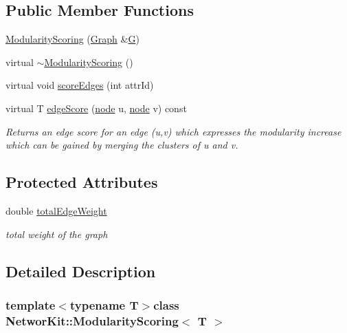 \subsection*{Public Member Functions}
\begin{DoxyCompactItemize}
\item 
\hyperlink{class_networ_kit_1_1_modularity_scoring_a0150d4dbef0af9e530410f4b2d98f144}{Modularity\-Scoring} (\hyperlink{class_networ_kit_1_1_graph}{Graph} \&\hyperlink{class_networ_kit_1_1_edge_scoring_a236d40c30ccbb022125d3dc915865d8a}{G})
\item 
virtual \hyperlink{class_networ_kit_1_1_modularity_scoring_a153adadf776bcb6ad8f3f946b5db5982}{$\sim$\-Modularity\-Scoring} ()
\item 
virtual void \hyperlink{class_networ_kit_1_1_modularity_scoring_a9c93ca2ca6126a4de8a2c3c196828116}{score\-Edges} (int attr\-Id)
\item 
virtual T \hyperlink{class_networ_kit_1_1_modularity_scoring_af1b95cbb6082e5159d080c392679708a}{edge\-Score} (\hyperlink{namespace_networ_kit_a61914158fd771265be48de9942369160}{node} u, \hyperlink{namespace_networ_kit_a61914158fd771265be48de9942369160}{node} v) const 
\begin{DoxyCompactList}\small\item\em Returns an edge score for an edge (u,v) which expresses the modularity increase which can be gained by merging the clusters of u and v. \end{DoxyCompactList}\end{DoxyCompactItemize}
\subsection*{Protected Attributes}
\begin{DoxyCompactItemize}
\item 
double \hyperlink{class_networ_kit_1_1_modularity_scoring_ae5c47d760a0d0a78349ddc7ed14786a2}{total\-Edge\-Weight}
\begin{DoxyCompactList}\small\item\em total weight of the graph \end{DoxyCompactList}\end{DoxyCompactItemize}


\subsection{Detailed Description}
\subsubsection*{template$<$typename T$>$class Networ\-Kit\-::\-Modularity\-Scoring$<$ T $>$}



